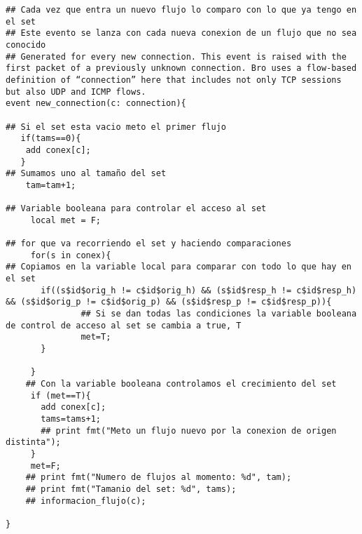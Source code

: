 \begin{lstlisting}[style=CodigoC]
## Cada vez que entra un nuevo flujo lo comparo con lo que ya tengo en el set
## Este evento se lanza con cada nueva conexion de un flujo que no sea conocido
## Generated for every new connection. This event is raised with the first packet of a previously unknown connection. Bro uses a flow-based definition of “connection” here that includes not only TCP sessions but also UDP and ICMP flows.
event new_connection(c: connection){

## Si el set esta vacio meto el primer flujo
   if(tams==0){
    add conex[c];
   }
## Sumamos uno al tamaño del set
    tam=tam+1;

## Variable booleana para controlar el acceso al set
     local met = F;

## for que va recorriendo el set y haciendo comparaciones
     for(s in conex){
## Copiamos en la variable local para comparar con todo lo que hay en el set
       if((s$id$orig_h != c$id$orig_h) && (s$id$resp_h != c$id$resp_h) && (s$id$orig_p != c$id$orig_p) && (s$id$resp_p != c$id$resp_p)){
               ## Si se dan todas las condiciones la variable booleana de control de acceso al set se cambia a true, T
               met=T;
       }

     }
    ## Con la variable booleana controlamos el crecimiento del set
     if (met==T){
       add conex[c];
       tams=tams+1;
       ## print fmt("Meto un flujo nuevo por la conexion de origen distinta");
     }
     met=F;
    ## print fmt("Numero de flujos al momento: %d", tam);
    ## print fmt("Tamanio del set: %d", tams);
    ## informacion_flujo(c);

}
\end{lstlisting}

